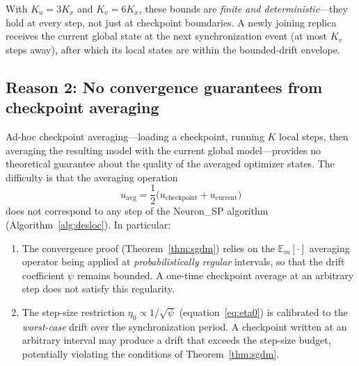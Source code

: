 \documentclass{article}
\begin{document}
With $K_u = 3K_x$ and $K_v = 6K_x$, these bounds are \emph{finite and
deterministic}---they hold at every step, not just at checkpoint
boundaries. A newly joining replica receives the current global state at
the next synchronization event (at most $K_v$ steps away), after which
its local states are within the bounded-drift envelope.

\subsection{Reason 2: No convergence guarantees from checkpoint averaging}
\label{sec:checkpoint_convergence}

Ad-hoc checkpoint averaging---loading a checkpoint, running $K$ local
steps, then averaging the resulting model with the current global
model---provides no theoretical guarantee about the quality of the
averaged optimizer states. The difficulty is that the averaging operation
\begin{equation}
u_{\text{avg}} = \frac{1}{2}\bigl(u_{\text{checkpoint}} + u_{\text{current}}\bigr)
\label{eq:ckpt_avg}
\end{equation}
does not correspond to any step of the Neuron\_SP algorithm
(Algorithm~\ref{alg:desloc}). In particular:

\begin{enumerate}
\item The convergence proof (Theorem~\ref{thm:sgdm}) relies on the
$\mathbb{E}_m[\cdot]$ averaging operator being applied at
\emph{probabilistically regular} intervals, so that the drift
coefficient $\psi$ remains bounded. A one-time checkpoint average at
an arbitrary step does not satisfy this regularity.

\item The step-size restriction $\eta_0 \propto 1/\sqrt{\psi}$
(equation~\eqref{eq:eta0}) is calibrated to the \emph{worst-case} drift
over the synchronization period. A checkpoint written at an arbitrary
interval may produce a drift that exceeds the step-size budget,
potentially violating the conditions of Theorem~\ref{thm:sgdm}.
\end{enumerate}
\end{document}

